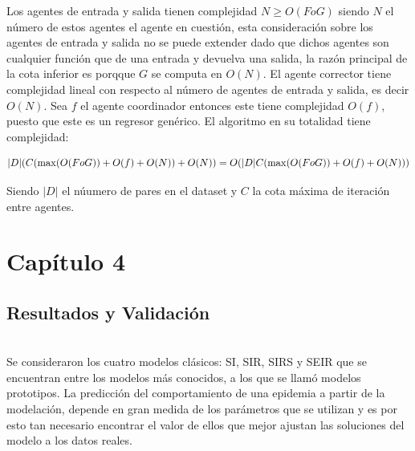 \documentclass{article}
\begin{document}
    Los agentes de entrada y salida tienen complejidad $N \geq O(FoG) $ siendo $N$ el número de estos agentes el agente en cuestión, esta consideración 
    sobre los agentes de entrada y salida no se puede extender dado que dichos agentes son cualquier función que de una entrada y devuelva una salida, la 
    razón principal de la cota inferior es porqque $G$ se computa en $O(N)$. El agente corrector tiene complejidad lineal con respecto al número de agentes 
    de entrada y salida, es decir $O(N)$. Sea $f$ el agente coordinador entonces este tiene complejidad $O(f)$, puesto que este es un regresor genérico. 
    El algoritmo en su totalidad tiene complejidad: 
    \begin{center}
        
        \begin{equation*}
                
                |D|(C( \max(O(F o G )) + O(f) + O(N)) + O(N)) \\
                = O(|D|C( \max(O(F o G )) + O(f) + O(N)))\\

        \end{equation*}

    \end{center}

Siendo $|D|$ el núumero de pares en el dataset y $C$ la cota máxima de iteración entre agentes.


\newpage

\section*{ \Huge Capítulo 4 }
\label{sec:17}
\subsection*{ \Large Resultados y Validación } \\

    Se consideraron los cuatro modelos clásicos:
    SI, SIR, SIRS y SEIR que se encuentran entre los modelos más conocidos, a los
    que se llamó modelos prototipos.
    La predicción del comportamiento de una epidemia a partir de la modelación,
    depende en gran medida de los parámetros que se utilizan y es por esto tan
    necesario encontrar el valor de ellos que mejor ajustan las soluciones del modelo
    a los datos reales. \\
\end{document}
